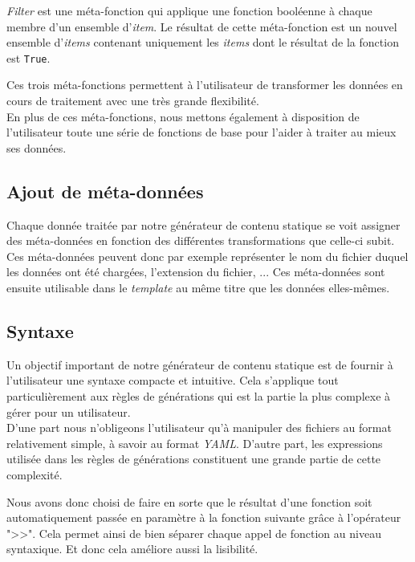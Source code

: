 		\textit{Filter} est une méta-fonction qui applique une fonction booléenne à chaque membre d'un ensemble d'\textit{item}. Le résultat de cette méta-fonction est un nouvel ensemble d'\textit{items} contenant uniquement les \textit{items} dont le résultat de la fonction est \texttt{True}.
		
		Ces trois méta-fonctions permettent à l'utilisateur de transformer les données en cours de traitement avec une très grande flexibilité.\\
		
		En plus de ces méta-fonctions, nous mettons également à disposition de l'utilisateur toute une série de fonctions de base pour l'aider à traiter au mieux ses données.
	
	\subsection{Ajout de méta-données}
	
		Chaque donnée traitée par notre générateur de contenu statique se voit assigner des méta-données en fonction des différentes transformations que celle-ci subit. Ces méta-données peuvent donc par exemple représenter le nom du fichier duquel les données ont été chargées, l'extension du fichier, ... Ces méta-données sont ensuite utilisable dans le \textit{template} au même titre que les données elles-mêmes.
		
	\subsection*{Syntaxe}
	
		Un objectif important de notre générateur de contenu statique est de fournir à l'utilisateur une syntaxe compacte et intuitive. Cela s'applique tout particulièrement aux règles de générations qui est la partie la plus complexe à gérer pour un utilisateur.\\
		
		D'une part nous n'obligeons l'utilisateur qu'à manipuler des fichiers au format relativement simple, à savoir au format \textit{YAML}. D'autre part, les expressions utilisée dans les règles de générations constituent une grande partie de cette complexité.
		
		Nous avons donc choisi de faire en sorte que le résultat d'une fonction soit automatiquement passée en paramètre à la fonction suivante grâce à l'opérateur ">>". Cela permet ainsi de bien séparer chaque appel de fonction au niveau syntaxique. Et donc cela améliore aussi la lisibilité.
		
